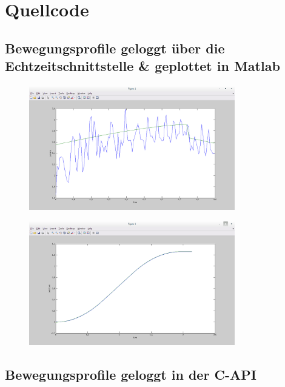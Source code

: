 \chapter{Quellcode}
\label{quellcode}

\section{Bewegungsprofile geloggt über die Echtzeitschnittstelle \& geplottet in Matlab}
\label{sec:profile_polyscope_rci}

\begin{figure}[H]
  \centering
    \includegraphics[width=0.8\textwidth]{pic/joint3_current_polyscope.png}
      \caption[Stromstärke wärend der Bewegung des 3. Gelenks]{}
      \label{fig:acceleration_profile_rci}
\end{figure}

\begin{figure}[H]
  \centering
    \includegraphics[width=0.8\textwidth]{pic/joint5_position_polyscope.png}
      \caption[Position der Soll und Ist Werte für das 5. Gelenk]{}
      \label{fig:position_joint5_rci}
\end{figure}

\section{Bewegungsprofile geloggt in der C-\ac{API}}
\label{sec:profiles_with_capi}

